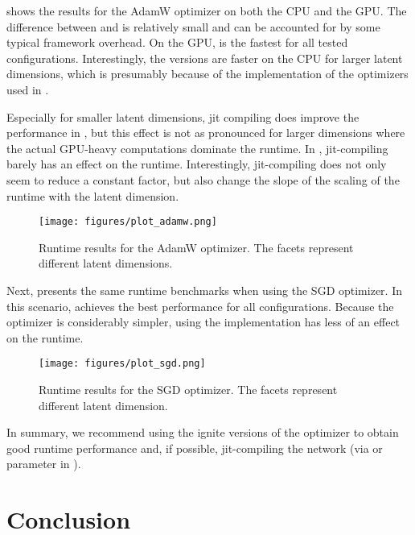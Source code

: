 \documentclass[article]{jss}
\theoremstyle{definition}
\begin{document}
 shows the results for the AdamW optimizer on both the CPU and the GPU.
The difference between \torch{} and \mlrttorch{} is relatively small and can be accounted for by some typical framework overhead.
On the GPU, \pytorch{} is the fastest for all tested configurations.
Interestingly, the \rlang{} versions are faster on the CPU for larger latent dimensions, which is presumably because of the \libtorch{} implementation of the optimizers used in \rlang{}.

Especially for smaller latent dimensions, jit compiling does improve the performance in \rlang{}, but this effect is not as pronounced for larger dimensions where the actual GPU-heavy computations dominate the runtime.
In \pytorch{}, jit-compiling barely has an effect on the runtime.
Interestingly, jit-compiling does not only seem to reduce a constant factor, but also change the slope of the scaling of the runtime with the latent dimension.


\begin{figure}[h]
    \centering
    \texttt{[image: figures/plot\_adamw.png]}
    \caption{Runtime results for the AdamW optimizer. The facets represent different latent dimensions.}
    \label{fig:adamw-benchmark}
\end{figure}

Next,  presents the same runtime benchmarks when using the SGD optimizer.
In this scenario, \pytorch{} achieves the best performance for all configurations.
Because the optimizer is considerably simpler, using the \libtorch{} implementation has less of an effect on the runtime.

\begin{figure}[h]
    \centering
    \texttt{[image: figures/plot\_sgd.png]}
    \caption{Runtime results for the SGD optimizer. The facets represent different latent dimension.}
    \label{fig:sgd-benchmark}
\end{figure}

In summary, we recommend using the ignite versions of the optimizer to obtain good runtime performance and, if possible, jit-compiling the network (via  or  parameter in \mlrttorch{}).

\section{Conclusion}\label{sec:conclusion}
\end{document}
